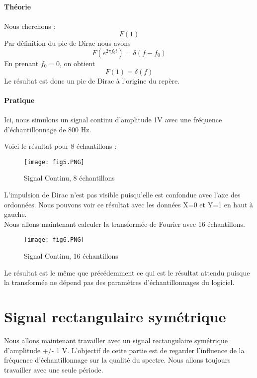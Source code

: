 \documentclass[oneside,a4paper,12pt]{article}
\begin{document}
	\paragraph{Théorie}\paragraph{}
	Nous cherchons : $$F(1)$$
	Par définition du pic de Dirac nous avons
	$$ F(e^{2 \pi f_{0} t})=\delta(f-f_{0}) $$
	En prenant $f_{0}=0$, on obtient  $$F(1) = \delta (f)$$ 
	Le résultat est donc un pic de Dirac à l’origine du repère.
	
	\paragraph{Pratique}\paragraph{}

	Ici, nous simulons un signal continu d’amplitude 1V avec une fréquence d’échantillonnage de 800 Hz.
	
	Voici le résultat pour 8 échantillons : 
	
	\begin{figure}[h]
		\centering
		\texttt{[image: fig5.PNG]}
		\caption{Signal Continu, 8 échantillons}
	\end{figure}
	L’impulsion de Dirac n’est pas visible puisqu’elle est confondue avec l’axe des ordonnées. Nous pouvons voir ce résultat avec les données X=0 et Y=1 en haut à gauche.\\
	
	Nous allons maintenant calculer la transformée de Fourier avec 16 échantillons.
	\begin{figure}[h]
		\centering
		\texttt{[image: fig6.PNG]}
		\caption{Signal Continu, 16 échantillons}
	\end{figure}
	Le résultat est le même que précédemment ce qui est le résultat attendu puisque la transformée ne dépend pas des paramètres d'échantillonnages du logiciel.\\
	\newpage
	\section{Signal rectangulaire symétrique}
	
	Nous allons maintenant travailler avec un signal rectangulaire symétrique d’amplitude +/- 1 V. L’objectif de cette partie est de regarder l’influence de la fréquence d’échantillonnage sur la qualité du spectre. Nous allons toujours travailler avec une seule période.\\
\end{document}

